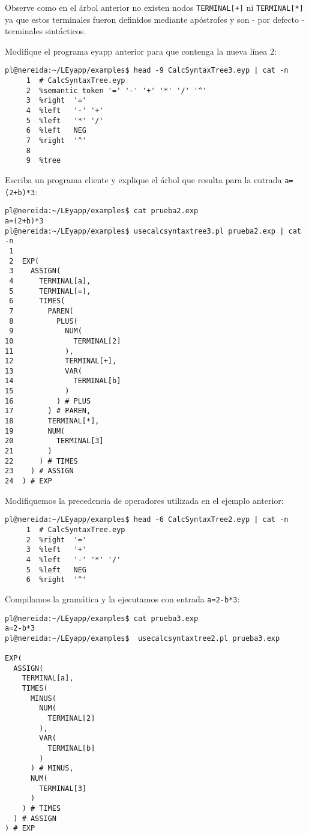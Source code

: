 
Observe como en el árbol anterior no existen nodos \verb|TERMINAL[+]| ni \verb|TERMINAL[*]|
ya que estos terminales fueron definidos mediante apóstrofes y son 
- por defecto - terminales sintácticos.

\begin{exercise}
Modifique el programa eyapp anterior para que contenga la nueva línea 2:

\begin{verbatim}
pl@nereida:~/LEyapp/examples$ head -9 CalcSyntaxTree3.eyp | cat -n
     1  # CalcSyntaxTree.eyp
     2  %semantic token '=' '-' '+' '*' '/' '^'
     3  %right  '='
     4  %left   '-' '+'
     5  %left   '*' '/'
     6  %left   NEG
     7  %right  '^'
     8
     9  %tree
\end{verbatim}
Escriba un programa cliente y explique el árbol que resulta
para la entrada \verb|a=(2+b)*3|:

\begin{verbatim}
pl@nereida:~/LEyapp/examples$ cat prueba2.exp
a=(2+b)*3
pl@nereida:~/LEyapp/examples$ usecalcsyntaxtree3.pl prueba2.exp | cat -n
 1
 2  EXP(
 3    ASSIGN(
 4      TERMINAL[a],
 5      TERMINAL[=],
 6      TIMES(
 7        PAREN(
 8          PLUS(
 9            NUM(
10              TERMINAL[2]
11            ),
12            TERMINAL[+],
13            VAR(
14              TERMINAL[b]
15            )
16          ) # PLUS
17        ) # PAREN,
18        TERMINAL[*],
19        NUM(
20          TERMINAL[3]
21        )
22      ) # TIMES
23    ) # ASSIGN
24  ) # EXP
\end{verbatim}
\end{exercise}


Modifiquemos la precedencia de operadores utilizada en el ejemplo anterior:
\begin{verbatim}
pl@nereida:~/LEyapp/examples$ head -6 CalcSyntaxTree2.eyp | cat -n
     1  # CalcSyntaxTree.eyp
     2  %right  '='
     3  %left   '+'
     4  %left   '-' '*' '/'
     5  %left   NEG
     6  %right  '^'
\end{verbatim}
Compilamos la gramática y la ejecutamos con entrada \verb|a=2-b*3|:

\begin{verbatim}
pl@nereida:~/LEyapp/examples$ cat prueba3.exp
a=2-b*3
pl@nereida:~/LEyapp/examples$  usecalcsyntaxtree2.pl prueba3.exp

EXP(
  ASSIGN(
    TERMINAL[a],
    TIMES(
      MINUS(
        NUM(
          TERMINAL[2]
        ),
        VAR(
          TERMINAL[b]
        )
      ) # MINUS,
      NUM(
        TERMINAL[3]
      )
    ) # TIMES
  ) # ASSIGN
) # EXP
\end{verbatim}

